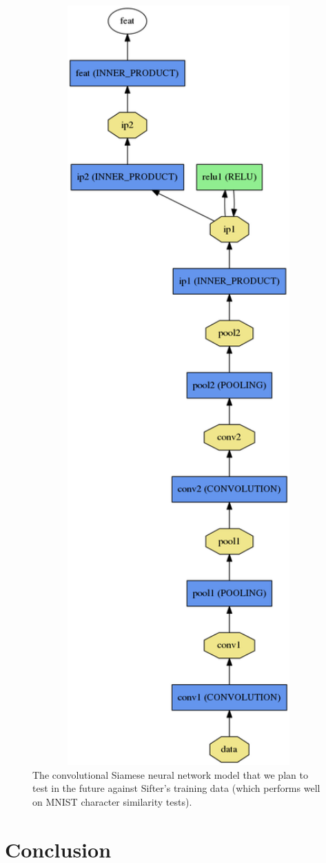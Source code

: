 \documentclass[12pt,twoside]{article}
\begin{document}
\begin{figure}[h]
\centering
\setlength{\abovecaptionskip}{-2.25in}
\includegraphics[angle=-90,origin=c,width=1.0\textwidth]{figures/siamese_model.png}
\caption{The convolutional Siamese neural network model that we plan to test in the future against Sifter's training data (which performs well on MNIST character similarity tests).}
\label{fig:siamese_model}
\end{figure}



\section{Conclusion}



\pagebreak

\printbibliography
\end{document}
